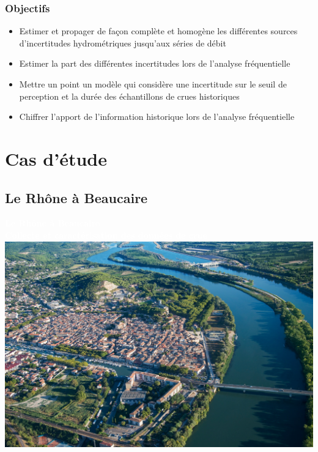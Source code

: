\documentclass[compress,9pt]{beamer}
\begin{document}
	\begin{frame}
	    \frametitle{Objectifs}
	    \begin{itemize}
	    
	    \item Estimer et propager de façon complète et homogène les différentes sources d'incertitudes hydrométriques jusqu'aux séries de débit
	    
	    \item Estimer la part des différentes incertitudes lors de l'analyse fréquentielle
	    
	    \item  Mettre un point un modèle qui considère une incertitude sur le seuil de perception et la durée des échantillons de crues historiques
	    
	    \item Chiffrer l'apport de l'information historique lors de l'analyse fréquentielle
	    
	    \end{itemize}
	\end{frame}
	
	
\section{Cas d'étude}
	\subsection{Le Rhône à Beaucaire}
	{
    \begin{frame}
        \begin{center}
				\textcolor{white}{\Large \textbf{Le Rhône à Beaucaire}}\\
		 		\vspace{0.3cm}
		 		\textcolor{white}{\large \textbf{Collecte et caractérisation des données de crue}}\\
		 		\vspace{0.8cm}
		 		\includegraphics[width = .7\textwidth]{./Figures/BcrAerien.jpg} 
        \end{center}
    \end{frame}
    }
    	
\end{document}
